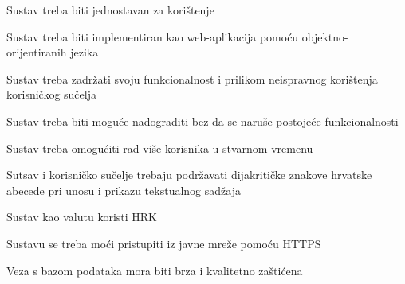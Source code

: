 		\begin{packed_item}
			
			\item  Sustav treba biti jednostavan za korištenje
			\item  Sustav treba biti implementiran kao web-aplikacija pomoću objektno-orijentiranih jezika
			\item  Sustav treba zadržati svoju funkcionalnost i prilikom neispravnog korištenja korisničkog sučelja
			\item  Sustav treba biti moguće nadograditi bez da se naruše postojeće funkcionalnosti
			\item  Sustav treba omogućiti rad više korisnika u stvarnom vremenu
			\item  Sutsav i korisničko sučelje trebaju podržavati dijakritičke znakove hrvatske abecede pri unosu i prikazu tekstualnog sadžaja
			\item  Sustav kao valutu koristi HRK
			\item  Sustavu se treba moći pristupiti iz javne mreže pomoću HTTPS
			\item  Veza s bazom podataka mora biti brza i kvalitetno zaštićena
			
		\end{packed_item}
			
			 
			 
			 
	